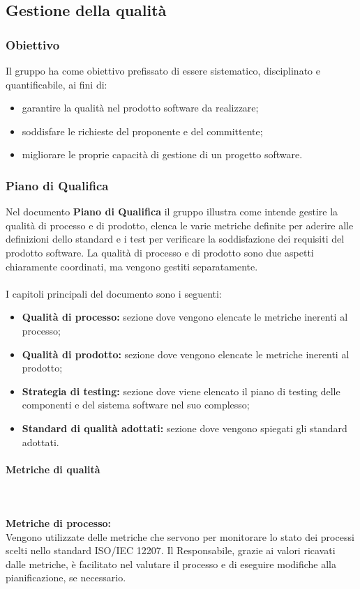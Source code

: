 \subsection{Gestione della qualità}
\subsubsection{Obiettivo}
Il gruppo \Gruppo ha come obiettivo prefissato di essere sistematico, disciplinato e quantificabile, ai fini di:
\begin{itemize}
    \item garantire la qualità nel prodotto software da realizzare;
    \item soddisfare le richieste del proponente e del committente;
    \item migliorare le proprie capacità di gestione di un progetto software.
\end{itemize}

\subsubsection{Piano di Qualifica}
Nel documento \textbf{Piano di Qualifica} il gruppo \Gruppo illustra come intende gestire la qualità di processo e di prodotto, elenca le varie metriche definite per aderire alle definizioni dello standard e i test per verificare la soddisfazione dei requisiti del prodotto software.
La qualità di processo e di prodotto sono due aspetti chiaramente coordinati, ma vengono gestiti separatamente. \\ \\
I capitoli principali del documento sono i seguenti:
\begin{itemize}
    \item \textbf{Qualità di processo:} sezione dove vengono elencate le metriche inerenti al processo;
    \item \textbf{Qualità di prodotto:} sezione dove vengono elencate le metriche inerenti al prodotto;
    \item \textbf{Strategia di testing:} sezione dove viene elencato il piano di testing delle componenti e del sistema software nel suo complesso;
    \item \textbf{Standard di qualità adottati:} sezione dove vengono spiegati gli standard adottati.
\end{itemize}

\paragraph{Metriche di qualità} \mbox{} \\ \\
\textbf{Metriche di processo:}\\
Vengono utilizzate delle metriche che servono per monitorare lo stato dei processi scelti nello standard ISO/IEC 12207. Il Responsabile, grazie ai valori ricavati dalle metriche, è facilitato nel
valutare il processo e di eseguire modifiche alla pianificazione, se necessario.\\

